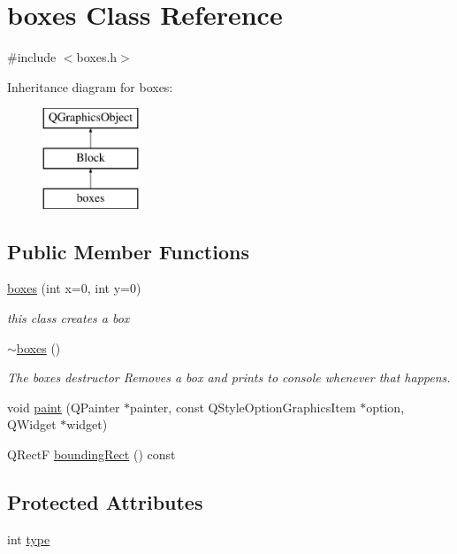 \hypertarget{classboxes}{\section{boxes Class Reference}
\label{classboxes}
}


{\ttfamily \#include $<$boxes.\-h$>$}

Inheritance diagram for boxes\-:\begin{figure}[H]
\begin{center}
\leavevmode
\includegraphics[height=3.000000cm]{classboxes}
\end{center}
\end{figure}
\subsection*{Public Member Functions}
\begin{DoxyCompactItemize}
\item 
\hyperlink{classboxes_a093427b27f4b84a803544cb738dc12e6}{boxes} (int x=0, int y=0)
\begin{DoxyCompactList}\small\item\em this class creates a box \end{DoxyCompactList}\item 
\hyperlink{classboxes_a7d70921b4fe775ad313ac80d6da55222}{$\sim$boxes} ()
\begin{DoxyCompactList}\small\item\em The boxes destructor Removes a box and prints to console whenever that happens. \end{DoxyCompactList}\item 
void \hyperlink{classboxes_aa07b0460f8be5da676c4369331061fa6}{paint} (Q\-Painter $\ast$painter, const Q\-Style\-Option\-Graphics\-Item $\ast$option, Q\-Widget $\ast$widget)
\item 
Q\-Rect\-F \hyperlink{classboxes_a4855400f92db9ebe776a79c79bac1d50}{bounding\-Rect} () const 
\end{DoxyCompactItemize}
\subsection*{Protected Attributes}
\begin{DoxyCompactItemize}
\item 
int \hyperlink{classboxes_a2600eb866b188f33fb6415fc358f449a}{type}
\end{DoxyCompactItemize}


